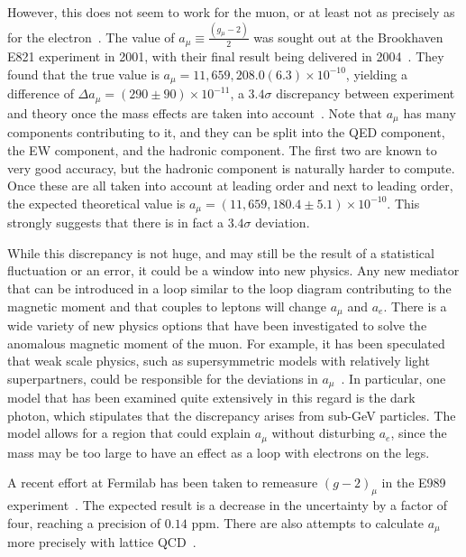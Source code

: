 However, this does not seem to work for the muon, or at least not as precisely as for the electron~\cite{Jegerlehner:2009ry}.
The value of $a_\mu \equiv \frac{(g_\mu-2)}{2}$ was sought out at the Brookhaven E821 experiment in 2001, with their final result being delivered in 2004~\cite{Hagiwara:2006jt}.
They found that the true value is $a_\mu = 11,659,208.0(6.3)\times 10^{-10}$, yielding a difference of $\Delta a_\mu = (290\pm90)\times 10^{-11}$, a $3.4\sigma$ discrepancy between experiment and theory once the mass effects are taken into account~\cite{Jegerlehner:2009ry}.
Note that $a_\mu$ has many components contributing to it, and they can be split into the QED component, the EW component, and the hadronic component.
The first two are known to very good accuracy, but the hadronic component is naturally harder to compute.
Once these are all taken into account at leading order and next to leading order, the expected theoretical value is $a_\mu = (11,659,180.4 \pm 5.1)\times 10^{-10}$.
This strongly suggests that there is in fact a $3.4\sigma$ deviation.

While this discrepancy is not huge, and may still be the result of a statistical fluctuation or an error, it could be a window into new physics.
Any new mediator that can be introduced in a loop similar to the loop diagram contributing to the magnetic moment and that couples to leptons will change $a_\mu$ and $a_e$.
There is a wide variety of new physics options that have been investigated to solve the anomalous magnetic moment of the muon.
For example, it has been speculated that weak scale physics, such as supersymmetric models with relatively light superpartners, could be responsible for the deviations in $a_\mu$~\cite{Czarnecki:2001pv}.
In particular, one model that has been examined quite extensively in this regard is the dark photon, which stipulates that the discrepancy arises from sub-GeV particles.
The model allows for a region that could explain $a_\mu$ without disturbing $a_e$, since the mass may be too large to have an effect as a loop with electrons on the legs.

A recent effort at Fermilab has been taken to remeasure $(g-2)_\mu$ in the E989 experiment~\cite{Venanzoni:2014ixa}.
The expected result is a decrease in the uncertainty by a factor of four, reaching a precision of $0.14$ ppm.
There are also attempts to calculate $a_\mu$ more precisely with lattice QCD~\cite{Juttner:2009yb, Renner:2010zj, Malak:2015sla}.
